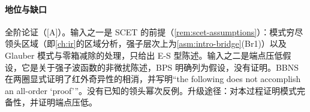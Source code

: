 \paragraph{地位与缺口}
全阶论证（[A]）。输入之一是 SCET 的前提（\cref{rem:scet-assumptions}）：模式穷尽领头区域（即\cref{ch:ir}的区域分析，强子层次上为\cref{asm:intro-bridge}(Br1)）以及 Glauber 模式与零箱减除的处理，只给出 E-S 型陈述。输入之二是端点压低假设，它是关于强子波函数的非微扰陈述，BPS 明确列为假设\cite{BauerPirjolStewart2001}，没有证明。BBNS 在两圈显式证明了红外奇异性的相消，并写明“the following does not accomplish an all-order ‘proof’”\cite[第~5~节]{BenekeEtAl2000}。没有已知的领头幂次反例。升级途径：对本过程证明模式完备性，并证明端点压低。
